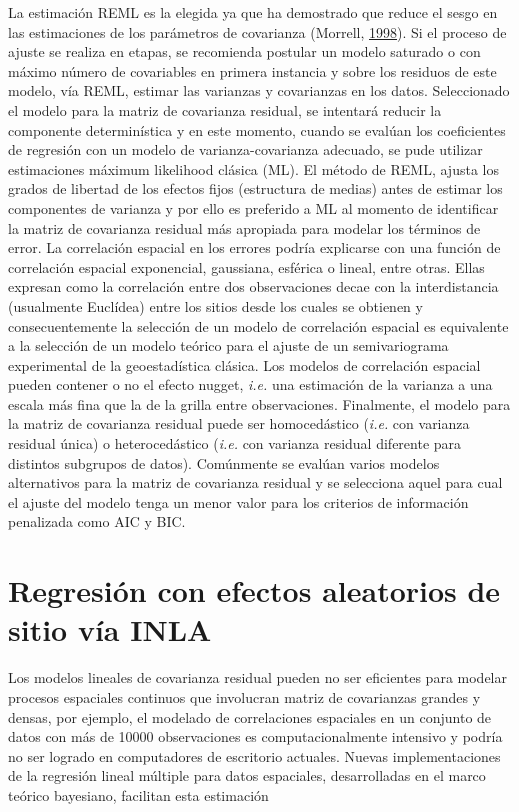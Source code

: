\documentclass[11pt,b5paper,]{krantz}
\begin{document}
La estimación REML es la elegida ya que ha demostrado que reduce el sesgo en las estimaciones de los parámetros de covarianza (Morrell, \protect\hyperlink{ref-Morrell_1998}{1998}). Si el proceso de ajuste se realiza en etapas, se recomienda postular un modelo saturado o con máximo número de covariables en primera instancia y sobre los residuos de este modelo, vía REML, estimar las varianzas y covarianzas en los datos. Seleccionado el modelo para la matriz de covarianza residual, se intentará reducir la componente determinística y en este momento, cuando se evalúan los coeficientes de regresión con un modelo de varianza-covarianza adecuado, se pude utilizar estimaciones máximum likelihood clásica (ML). El método de REML, ajusta los grados de libertad de los efectos fijos (estructura de medias) antes de estimar los componentes de varianza y por ello es preferido a ML al momento de identificar la matriz de covarianza residual más apropiada para modelar los términos de error. La correlación espacial en los errores podría explicarse con una función de correlación espacial exponencial, gaussiana, esférica o lineal, entre otras. Ellas expresan como la correlación entre dos observaciones decae con la interdistancia (usualmente Euclídea) entre los sitios desde los cuales se obtienen y consecuentemente la selección de un modelo de correlación espacial es equivalente a la selección de un modelo teórico para el ajuste de un semivariograma experimental de la geoestadística clásica. Los modelos de correlación espacial pueden contener o no el efecto nugget, \emph{i.e.} una estimación de la varianza a una escala más fina que la de la grilla entre observaciones. Finalmente, el modelo para la matriz de covarianza residual puede ser homocedástico (\emph{i.e.} con varianza residual única) o heterocedástico (\emph{i.e.} con varianza residual diferente para distintos subgrupos de datos). Comúnmente se evalúan varios modelos alternativos para la matriz de covarianza residual y se selecciona aquel para cual el ajuste del modelo tenga un menor valor para los criterios de información penalizada como AIC y BIC.

\hypertarget{regresiuxf3n-con-efectos-aleatorios-de-sitio-vuxeda-inla}{%
\section{Regresión con efectos aleatorios de sitio vía INLA}\label{regresiuxf3n-con-efectos-aleatorios-de-sitio-vuxeda-inla}}

Los modelos lineales de covarianza residual pueden no ser eficientes para modelar procesos espaciales continuos que involucran matriz de covarianzas grandes y densas, por ejemplo, el modelado de correlaciones espaciales en un conjunto de datos con más de 10000 observaciones es computacionalmente intensivo y podría no ser logrado en computadores de escritorio actuales. Nuevas implementaciones de la regresión lineal múltiple para datos espaciales, desarrolladas en el marco teórico bayesiano, facilitan esta estimación
\end{document}
